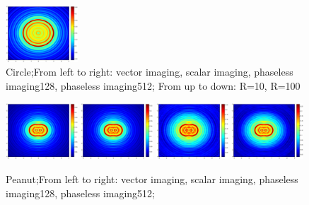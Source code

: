 \documentclass[12pt]{iopart}
\begin{document}
\begin{figure}
	\includegraphics[width=0.24\textwidth]{./graphic_phase/circle_r_100_k_4_phaseless_n_512_bias_100.eps}
	
	\caption{Circle;From left to right: vector imaging, scalar imaging, phaseless imaging128, phaseless imaging512; From up to down: R=10, R=100 }\label{figure_circle_phaless}
\end{figure}
\begin{figure}
	\centering
	\includegraphics[width=0.24\textwidth]{./graphic_phase/peanut_r_10_k_4_vector.eps}
	\includegraphics[width=0.24\textwidth]{./graphic_phase/peanut_r_10_k_4_scalar.eps}
	\includegraphics[width=0.24\textwidth]{./graphic_phase/peanut_r_10_k_4_phaseless_n_128_bias_100.eps}
	\includegraphics[width=0.24\textwidth]{./graphic_phase/peanut_r_10_k_4_phaseless_n_512_bias_100.eps}
	\caption{Peanut;From left to right: vector imaging, scalar imaging, phaseless imaging128, phaseless imaging512;  }\label{figure_peanut_phaless}
\end{figure}
\end{document}
